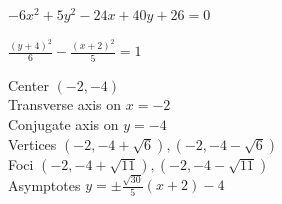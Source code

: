 \documentclass{ximera}
\begin{document}
\begin{question}
\begin{problem}
\end{problem}

\begin{problem}\label{stdfrmhyplast}
    $-6x^2+5y^2-24x+40y+26=0$ 

\begin{solution}
    $\frac{(y+4)^{2}}{6} - \frac{(x+2)^{2}}{5} = 1$

Center $(-2, -4)$\\
Transverse axis on $x=-2$\\
Conjugate axis on $y=-4$\\
Vertices $\left(-2,-4+\sqrt{6} \right), \left(-2,-4-\sqrt{6} \right)$\\
Foci $\left(-2, -4+\sqrt{11} \right), \left(-2, -4-\sqrt{11} \right)$\\
Asymptotes $y = \pm \frac{\sqrt{30}}{5}(x + 2) - 4$
\end{solution}
    
\end{problem}

\end{question}
\end{document}
